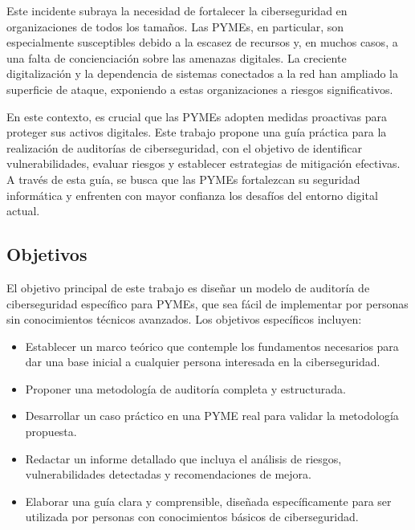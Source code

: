 \documentclass[a4paper, 11pt]{article}
\begin{document}
Este incidente subraya la necesidad de fortalecer la ciberseguridad en organizaciones de todos los tamaños. Las PYMEs, en particular, son especialmente susceptibles debido a la escasez de recursos y, en muchos casos, a una falta de concienciación sobre las amenazas digitales. 
La creciente digitalización y la dependencia de sistemas conectados a la red han ampliado la superficie de ataque, exponiendo a estas organizaciones a riesgos significativos.
\par\vspace{0.5cm}

En este contexto, es crucial que las PYMEs adopten medidas proactivas para proteger sus activos digitales. Este trabajo propone una guía práctica para la realización de auditorías de ciberseguridad, con el objetivo de identificar vulnerabilidades, evaluar riesgos y establecer 
estrategias de mitigación efectivas. A través de esta guía, se busca que las PYMEs fortalezcan su seguridad informática y enfrenten con mayor confianza los desafíos del entorno digital actual.
\par\vspace{0.5cm}

\clearpage



\subsection{Objetivos}
\par\vspace{0.5cm}

El objetivo principal de este trabajo es dise\~nar un modelo de auditor\'ia de ciberseguridad  espec\'ifico para PYMEs, que sea f\'acil de implementar por personas sin conocimientos t\'ecnicos avanzados. Los objetivos espec\'ificos incluyen:

\begin{itemize}
    \item Establecer un marco te\'orico que contemple los fundamentos necesarios para dar una base inicial a cualquier persona interesada en la ciberseguridad.
    \item Proponer una metodolog\'ia de auditor\'ia completa y estructurada.
    \item Desarrollar un caso pr\'actico en una PYME real para validar la metodolog\'ia propuesta.
    \item Redactar un informe detallado que incluya el an\'alisis de riesgos, vulnerabilidades detectadas y recomendaciones de mejora.
    \item Elaborar una guía clara y comprensible, diseñada específicamente para ser utilizada por personas con conocimientos básicos de ciberseguridad.
\end{itemize}
\par\vspace{0.5cm}
\end{document}
